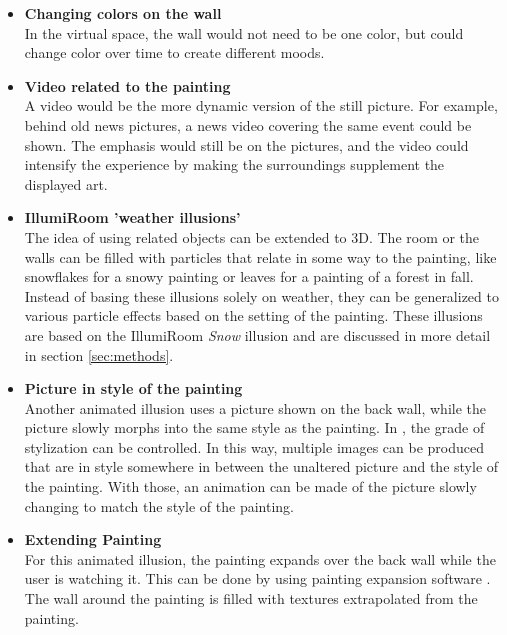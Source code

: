 \documentclass[a4paper]{article}
\begin{document}
\begin{itemize}

\item{\textbf{Changing colors on the wall}}
\\In the virtual space, the wall would not need to be one color, but could change color over time to create different moods.

\item{\textbf{Video related to the painting}}
\\A video would be the more dynamic version of the still picture. For example, behind old news pictures, a news video covering the same event could be shown. The emphasis would still be on the pictures, and the video could intensify the experience by making the surroundings supplement the displayed art.

\item{\textbf{IllumiRoom 'weather illusions'}}
\\The idea of using related objects can be extended to 3D. The room or the walls can be filled with particles that relate in some way to the painting, like snowflakes for a snowy painting or leaves for a painting of a forest in fall. Instead of basing these illusions solely on weather, they can be generalized to various particle effects based on the setting of the painting. These illusions are based on the IllumiRoom \emph{Snow} illusion \cite{illumiroom} and are discussed in more detail in section \ref{sec:methods}.

\item{\textbf{Picture in style of the painting}}
\\Another animated illusion uses a picture shown on the back wall, while the picture slowly morphs into the same style as the painting. In \cite{gatys}, the grade of stylization can be controlled. In this way, multiple images can be produced that are in style somewhere in between the unaltered picture and the style of the painting. With those, an animation can be made of the picture slowly changing to match the style of the painting.

\item{\textbf{Extending Painting}}
\\For this animated illusion, the painting expands over the back wall while the user is watching it. This can be done by using painting expansion software \cite{inpainting}. The wall around the painting is filled with textures extrapolated from the painting.

\end{itemize}
\end{document}
